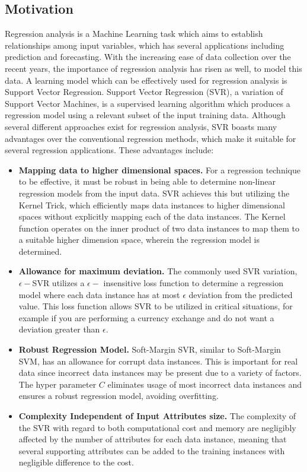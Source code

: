 \documentclass[12pt]{article}
\begin{document}
\subsection{Motivation}
Regression analysis is a Machine Learning task which aims to establish relationships among input variables, which has several applications including prediction and forecasting. With the increasing ease of data collection over the recent years, the importance of regression analysis has risen as well, to model this data. A learning model which can be effectively used for regression analysis is Support Vector Regression.
\newline\newline
Support Vector Regression (SVR), a variation of Support Vector Machines, is a supervised learning algorithm which produces a regression model using a relevant subset of the input training data. Although several different approaches exist for regression analysis, SVR boasts many advantages over the conventional regression methods, which make it suitable for several regression applications. These advantages include:
\begin{itemize}
\item {\bf Mapping data to higher dimensional spaces.}
For a regression technique to be effective, it must be robust in being able to determine non-linear regression models from the input data.
SVR achieves this but utilizing the Kernel Trick, which efficiently maps data instances to higher dimensional spaces without explicitly mapping each of the data instances. The Kernel function operates on the inner product of two data instances to map them to a suitable higher dimension space, wherein the regression model is determined.
\item {\bf Allowance for maximum deviation.}
The commonly used SVR variation, $\epsilon-$SVR utilizes a $\epsilon-$ insensitive loss function to determine a regression model where each data instance has at most $\epsilon$ deviation from the predicted value. This loss function allows SVR to be utilized in critical situations, for example if you are performing a currency exchange and do not want a deviation greater than $\epsilon$.
\item {\bf Robust Regression Model.}
Soft-Margin SVR, similar to Soft-Margin SVM, has an allowance for corrupt data instances. This is important for real data since incorrect data instances may be present due to a variety of factors. The hyper parameter $C$ eliminates usage of most incorrect data instances and ensures a robust regression model, avoiding overfitting.
\item  {\bf Complexity Independent of Input Attributes size.}
The complexity of the SVR with regard to both computational cost and memory are negligibly affected by the number of attributes for each data instance, meaning that several supporting attributes can be added to the training instances with negligible difference to the cost.
\end{itemize}
\end{document}
